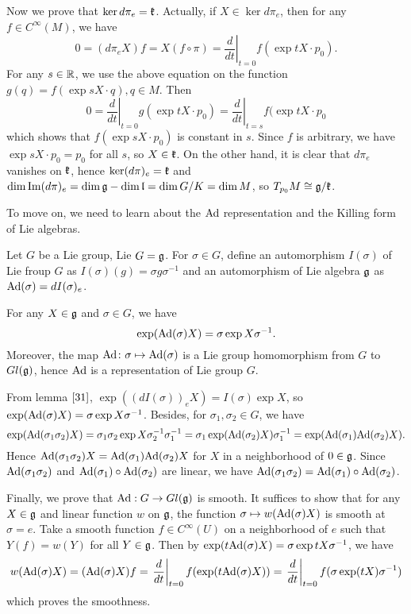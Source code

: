 Now we prove that $\ker d\pi_e = {\mathfrak k}$. Actually, if $X\in \ker
d\pi_e$,  then for any $f\in C^{\infty}(M)$, we have 
\[0 = (d\pi_eX)f = X(f\circ
\pi)=\left.\frac{d}{dt}\right|_{t=0}f(\exp tX\cdot p_0).
\]
For any $s \in {\mathbb R}$, we use the above equation on the function
$g(q)=f(\exp sX \cdot q), q\in M$. Then
\[
0=\left.\frac{d}{dt}\right|_{t=0}g(\exp tX\cdot
p_0)=\left.\frac{d}{dt}\right|_{t=s}f(\exp tX\cdot p_0
\]
which shows that $f(\exp sX\cdot p_0)$ is constant in $s$. Since
$f$ is arbitrary, we have $\exp sX\cdot p_0 = p_0$ for all $s$,
so $X\in {\mathfrak k}$. On the other hand, it is clear that $d\pi_e$
vanishes on ${\mathfrak k}$, hence $\ker(d\pi)_e={\mathfrak k}$ and
$\dim\mathrm{Im}(d\pi)_e = \dim{\mathfrak g}-\dim{\mathfrak l} = \dim G/K = \dim
M$, so $T_{p_0}M\cong {\mathfrak g}/{\mathfrak k}$.
\eproof


To move on, we need to learn about the $\mathrm{Ad}$ representation and
the Killing form of Lie algebras.

\begin{definition}
	Let $G$ be a Lie group, Lie $G = {\mathfrak g}$. For $\sigma \in G$,
	define an automorphism $I({\sigma})$ of Lie froup $G$ as
	$I(\sigma)(g) = \sigma g\sigma^{-1}$ and an automorphism of
	Lie algebra ${\mathfrak g}$ as $\mathrm{Ad}(\sigma) = dI(\sigma)_e$.
\end{definition}
\begin{theorem}
	For any $X\in {\mathfrak g}$ and $\sigma \in G$, we
	have$$\exp(\mathrm{Ad}(\sigma)X) = \sigma\exp X\sigma^{-1}.$$
	Moreover, the map $\mathrm{Ad}\colon\sigma\mapsto\mathrm{Ad}(\sigma)$ is a Lie
	group homomorphism from $G$ to $Gl({\mathfrak g})$, hence $\mathrm{Ad}$ is a
	representation of Lie group $G$.
\end{theorem}
\bproof
From lemma $\ref{31}$, $\exp((dI(\sigma))_eX) = I(\sigma)\exp X$,
so $\exp(\mathrm{Ad}(\sigma)X) = \sigma\exp X\sigma^{-1}$. Besides, for
$\sigma_1, \sigma_2\in G$, we have
$$\exp(\mathrm{Ad}(\sigma_1\sigma_2)X) = \sigma_1\sigma_2\exp
X\sigma_2^{-1}\sigma_1^{-1} =
\sigma_1\exp(\mathrm{Ad}(\sigma_2)X)\sigma_1^{-1} =
\exp(\mathrm{Ad}(\sigma_1)\mathrm{Ad}(\sigma_2) X).$$
Hence $\mathrm{Ad}(\sigma_1\sigma_2)X = \mathrm{Ad}(\sigma_1)\mathrm{Ad}(\sigma_2) X$ for
$X$ in a neighborhood of $0\in{\mathfrak g}$. Since
$\mathrm{Ad}(\sigma_1\sigma_2)$ and $\mathrm{Ad}(\sigma_1)\circ\mathrm{Ad}(\sigma_2)$ are
linear, we have $\mathrm{Ad}(\sigma_1\sigma_2) =
\mathrm{Ad}(\sigma_1)\circ\mathrm{Ad}(\sigma_2)$. 

Finally, we prove that $\mathrm{Ad}: G\to Gl({\mathfrak g})$ is smooth. It
suffices to show that for any $X\in {\mathfrak g}$ and linear function $w$
on ${\mathfrak g}$, the function $\sigma\mapsto w(\mathrm{Ad}(\sigma)X)$ is smooth
at $\sigma=e$. Take a smooth function $f\in C^{\infty}(U)$ on a
neighborhood of $e$ such that $Y(f) = w(Y)$ for all $Y\in {\mathfrak g}$.
Then by $\exp(t\mathrm{Ad}(\sigma)X) = \sigma\exp tX\sigma^{-1}$, we have
$$w(\mathrm{Ad}(\sigma)X) = (\mathrm{Ad}(\sigma)X)f =
\left.\frac{d}{dt}\right|_{t =
0}f(\exp(t\mathrm{Ad}(\sigma)X))=\left.\frac{d}{dt}\right|_{t=0}f(\sigma
\exp(tX)\sigma^{-1})$$
which proves the smoothness.
\eproof

